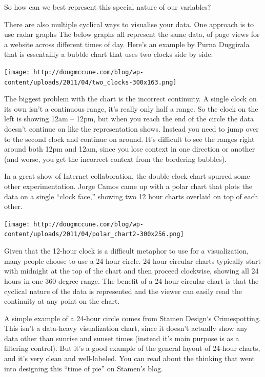 \documentclass[
]{book}
\begin{document}
So how can we best represent this special nature of our variables?

There are also multiple cyclical ways to visualise your data. One approach is to use radar graphs The below graphs all represent the same data, of page views for a website across different times of day. Here's an example by Purna Duggirala that is essentailly a bubble chart that uses two clocks side by side:

\texttt{[image: http://dougmccune.com/blog/wp-content/uploads/2011/04/two\_clocks-300x163.png]}

The biggest problem with the chart is the incorrect continuity. A single clock on its own isn't a continuous range, it's really only half a range. So the clock on the left is showing 12am -- 12pm, but when you reach the end of the circle the data doesn't continue on like the representation shows. Instead you need to jump over to the second clock and continue on around. It's difficult to see the ranges right around both 12pm and 12am, since you lose context in one direction or another (and worse, you get the incorrect context from the bordering bubbles).

In a great show of Internet collaboration, the double clock chart spurred some other experimentation. Jorge Camos came up with a polar chart that plots the data on a single ``clock face,'' showing two 12 hour charts overlaid on top of each other.

\texttt{[image: http://dougmccune.com/blog/wp-content/uploads/2011/04/polar\_chart2-300x256.png]}

Given that the 12-hour clock is a difficult metaphor to use for a visualization, many people choose to use a 24-hour circle. 24-hour circular charts typically start with midnight at the top of the chart and then proceed clockwise, showing all 24 hours in one 360-degree range. The benefit of a 24-hour circular chart is that the cyclical nature of the data is represented and the viewer can easily read the continuity at any point on the chart.

A simple example of a 24-hour circle comes from Stamen Design`s Crimespotting. This isn't a data-heavy visualization chart, since it doesn't actually show any data other than sunrise and sunset times (instead it's main purpose is as a filtering control). But it's a good example of the general layout of 24-hour charts, and it's very clean and well-labeled. You can read about the thinking that went into designing this ``time of pie'' on Stamen's blog.
\end{document}
